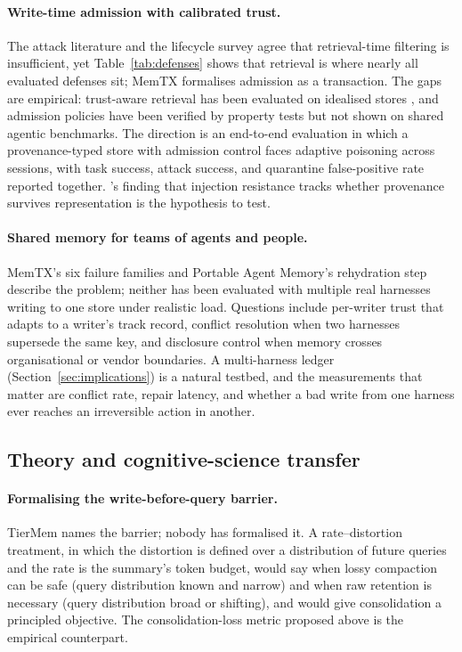 \documentclass[11pt]{article}
\begin{document}
\paragraph{Write-time admission with calibrated trust.}
The attack literature \citep{chen2024agentpoison,dong2025minja} and the lifecycle survey \citep{lin2026security} agree that retrieval-time filtering is insufficient, yet Table~\ref{tab:defenses} shows that retrieval is where nearly all evaluated defenses sit; MemTX formalises admission as a transaction. The gaps are empirical: trust-aware retrieval has been evaluated on idealised stores \citep{sunil2026poisoning}, and admission policies have been verified by property tests but not shown on shared agentic benchmarks. The direction is an end-to-end evaluation in which a provenance-typed store with admission control faces adaptive poisoning across sessions, with task success, attack success, and quarantine false-positive rate reported together. \citet{spencer2026groundtruth}'s finding that injection resistance tracks whether provenance survives representation is the hypothesis to test.

\paragraph{Shared memory for teams of agents and people.}
MemTX's six failure families and Portable Agent Memory's rehydration step describe the problem; neither has been evaluated with multiple real harnesses writing to one store under realistic load. Questions include per-writer trust that adapts to a writer's track record, conflict resolution when two harnesses supersede the same key, and disclosure control when memory crosses organisational or vendor boundaries. A multi-harness ledger (Section~\ref{sec:implications}) is a natural testbed, and the measurements that matter are conflict rate, repair latency, and whether a bad write from one harness ever reaches an irreversible action in another.

\subsection{Theory and cognitive-science transfer}

\paragraph{Formalising the write-before-query barrier.}
TierMem names the barrier; nobody has formalised it. A rate--distortion treatment, in which the distortion is defined over a distribution of future queries and the rate is the summary's token budget, would say when lossy compaction can be safe (query distribution known and narrow) and when raw retention is necessary (query distribution broad or shifting), and would give consolidation a principled objective. The consolidation-loss metric proposed above is the empirical counterpart.
\end{document}
